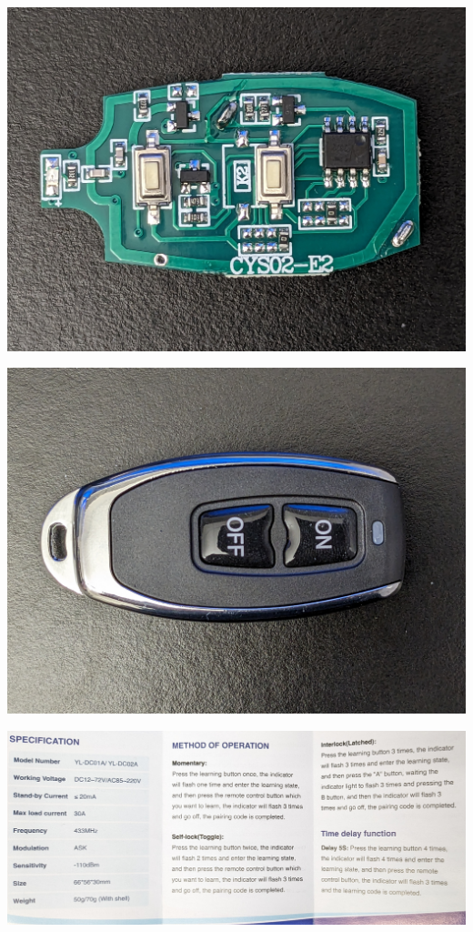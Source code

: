 \documentclass{beamer}
\begin{document}
\begin{frame}
\includegraphics[width=\textwidth]{../Pics/device/fob_front_bare.jpg}
\end{frame}

\begin{frame}
\includegraphics[width=\textwidth]{../Pics/device/fob_front_case.jpg}
\end{frame}

\begin{frame}
\includegraphics[width=\textwidth]{../Pics/device/manual_back.jpg}
\end{frame}
\end{document}
